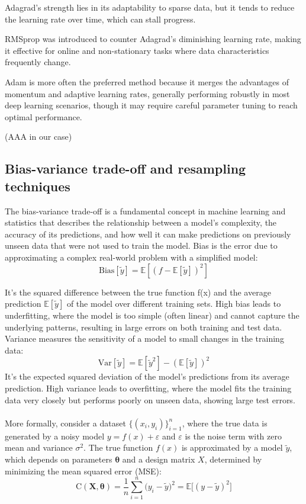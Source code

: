 \documentclass[
 reprint,            %
 amsmath,amssymb,
 aps,
]{revtex4-2}
\begin{document}
Adagrad's strength lies in its adaptability to sparse data, but it tends to reduce the learning rate over time, which can stall progress. 

RMSprop was introduced to counter Adagrad's diminishing learning rate, making it effective for online and non-stationary tasks where data characteristics frequently change. 

Adam is more often the preferred method because it merges the advantages of momentum and adaptive learning rates, generally performing robustly in most deep learning scenarios, though it may require careful parameter tuning to reach optimal performance.

(AAA in our case)

\subsection{Bias-variance trade-off and resampling techniques}

The bias-variance trade-off is a fundamental concept in machine learning and statistics that describes the relationship between a model's complexity, the accuracy of its predictions, and how well it can make predictions on previously unseen data that were not used to train the model\cite{hjorthjensen_week38}. 
Bias is the error due to approximating a complex real-world problem with a simplified model: 
$$\mathrm{Bias}[\tilde y]= \mathbb{E}[(f-\mathbb{E}[\tilde y])^2]$$

It's the squared difference between the true function f(x) and the average prediction $\mathbb{E}[\tilde y]$ of the model over different training sets. High bias leads to underfitting, where the model is too simple (often linear) and cannot capture the underlying patterns, resulting in large errors on both training and test data.
\\Variance measures the sensitivity of a model to small changes in the training data:
$$
\mathrm{Var}[\tilde y] = \mathbb{E}[\tilde y^2] - (\mathbb{E}[\tilde y])^2
$$
It's the expected squared deviation of the model's predictions from its average prediction.
High variance leads to overfitting, where the model fits the training data very closely but performs poorly on unseen data, showing large test errors.\\\\
More formally, consider a dataset $\{(x_i, y_i)\}_{i=1}^n$, where the true data is generated by a noisy model $y = f(x) + \varepsilon$ and $\varepsilon$ is the noise term with zero mean and variance $\sigma^2$. 
The true function $f(x)$ is approximated by a model $\tilde y$, which depends on parameters $\boldsymbol{\theta}$ and a design matrix $X$, determined by minimizing the mean squared error (MSE):
$$
\text{C}(\boldsymbol{X, \theta}) = \frac{1}{n} \sum_{i=1}^n \big( y_i - \tilde y \big)^2= \mathbb{E}\big[(y - \tilde y)^2\big]
$$
\end{document}
